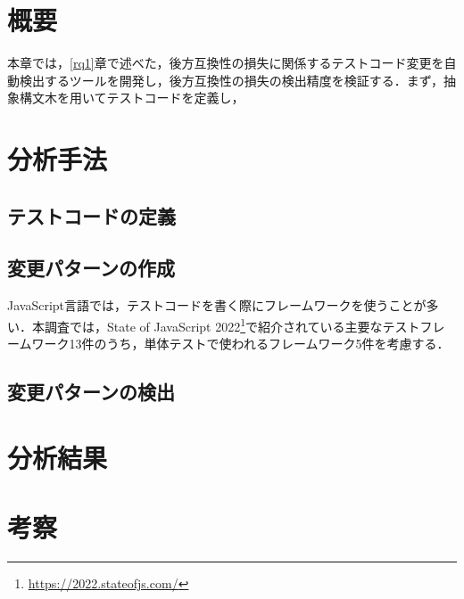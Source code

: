 \documentclass[11pt,dvipdfmx]{jreport}
\begin{document}
\section{概要}
本章では，\ref{rq1}章で述べた，後方互換性の損失に関係するテストコード変更を自動検出するツールを開発し，後方互換性の損失の検出精度を検証する．まず，抽象構文木を用いてテストコードを定義し，







\section{分析手法}

\subsection{テストコードの定義}

\subsection{変更パターンの作成}
JavaScript言語では，テストコードを書く際にフレームワークを使うことが多い．本調査では，State of JavaScript 2022\footnote{\url{https://2022.stateofjs.com/}}で紹介されている主要なテストフレームワーク13件のうち，単体テストで使われるフレームワーク5件を考慮する．

\subsection{変更パターンの検出}

\section{分析結果}

\section{考察}
\end{document}
